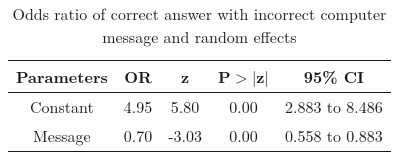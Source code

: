 \begin{table}[htbp]
\centering
\caption{Odds ratio of correct answer with incorrect computer message and random effects} 
\label{ormesgrecc}
\begin{tabular}{ccccc}
  \toprule
Parameters & OR & z & P$>$$|$z$|$ & 95\% CI \\ 
  \midrule
Constant & 4.95 & 5.80 & 0.00 & 2.883 to 8.486 \\ 
  Message & 0.70 & -3.03 & 0.00 & 0.558 to 0.883 \\ 
   \bottomrule
\end{tabular}
\end{table}

